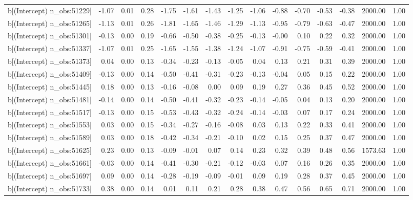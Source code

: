 \begin{table}[ht]
\begin{tabular}{rrrrrrrrrrrrrrr}
  b[(Intercept) n\_obs:51229] & -1.07 & 0.01 & 0.28 & -1.75 & -1.61 & -1.43 & -1.25 & -1.06 & -0.88 & -0.70 & -0.53 & -0.38 & 2000.00 & 1.00 \\ 
  b[(Intercept) n\_obs:51265] & -1.13 & 0.01 & 0.26 & -1.81 & -1.65 & -1.46 & -1.29 & -1.13 & -0.95 & -0.79 & -0.63 & -0.47 & 2000.00 & 1.00 \\ 
  b[(Intercept) n\_obs:51301] & -0.13 & 0.00 & 0.19 & -0.66 & -0.50 & -0.38 & -0.25 & -0.13 & -0.00 & 0.10 & 0.22 & 0.32 & 2000.00 & 1.00 \\ 
  b[(Intercept) n\_obs:51337] & -1.07 & 0.01 & 0.25 & -1.65 & -1.55 & -1.38 & -1.24 & -1.07 & -0.91 & -0.75 & -0.59 & -0.41 & 2000.00 & 1.00 \\ 
  b[(Intercept) n\_obs:51373] & 0.04 & 0.00 & 0.13 & -0.34 & -0.23 & -0.13 & -0.05 & 0.04 & 0.13 & 0.21 & 0.31 & 0.39 & 2000.00 & 1.00 \\ 
  b[(Intercept) n\_obs:51409] & -0.13 & 0.00 & 0.14 & -0.50 & -0.41 & -0.31 & -0.23 & -0.13 & -0.04 & 0.05 & 0.15 & 0.22 & 2000.00 & 1.00 \\ 
  b[(Intercept) n\_obs:51445] & 0.18 & 0.00 & 0.13 & -0.16 & -0.08 & 0.00 & 0.09 & 0.19 & 0.27 & 0.36 & 0.45 & 0.52 & 2000.00 & 1.00 \\ 
  b[(Intercept) n\_obs:51481] & -0.14 & 0.00 & 0.14 & -0.50 & -0.41 & -0.32 & -0.23 & -0.14 & -0.05 & 0.04 & 0.13 & 0.20 & 2000.00 & 1.00 \\ 
  b[(Intercept) n\_obs:51517] & -0.13 & 0.00 & 0.15 & -0.53 & -0.43 & -0.32 & -0.24 & -0.14 & -0.03 & 0.07 & 0.17 & 0.24 & 2000.00 & 1.00 \\ 
  b[(Intercept) n\_obs:51553] & 0.03 & 0.00 & 0.15 & -0.34 & -0.27 & -0.16 & -0.08 & 0.03 & 0.13 & 0.22 & 0.33 & 0.41 & 2000.00 & 1.00 \\ 
  b[(Intercept) n\_obs:51589] & 0.03 & 0.00 & 0.18 & -0.42 & -0.34 & -0.21 & -0.10 & 0.02 & 0.15 & 0.25 & 0.37 & 0.47 & 2000.00 & 1.00 \\ 
  b[(Intercept) n\_obs:51625] & 0.23 & 0.00 & 0.13 & -0.09 & -0.01 & 0.07 & 0.14 & 0.23 & 0.32 & 0.39 & 0.48 & 0.56 & 1573.63 & 1.00 \\ 
  b[(Intercept) n\_obs:51661] & -0.03 & 0.00 & 0.14 & -0.41 & -0.30 & -0.21 & -0.12 & -0.03 & 0.07 & 0.16 & 0.26 & 0.35 & 2000.00 & 1.00 \\ 
  b[(Intercept) n\_obs:51697] & 0.09 & 0.00 & 0.14 & -0.28 & -0.19 & -0.09 & -0.01 & 0.09 & 0.19 & 0.28 & 0.37 & 0.45 & 2000.00 & 1.00 \\ 
  b[(Intercept) n\_obs:51733] & 0.38 & 0.00 & 0.14 & 0.01 & 0.11 & 0.21 & 0.28 & 0.38 & 0.47 & 0.56 & 0.65 & 0.71 & 2000.00 & 1.00 \\ 

\end{tabular}
\end{table}
